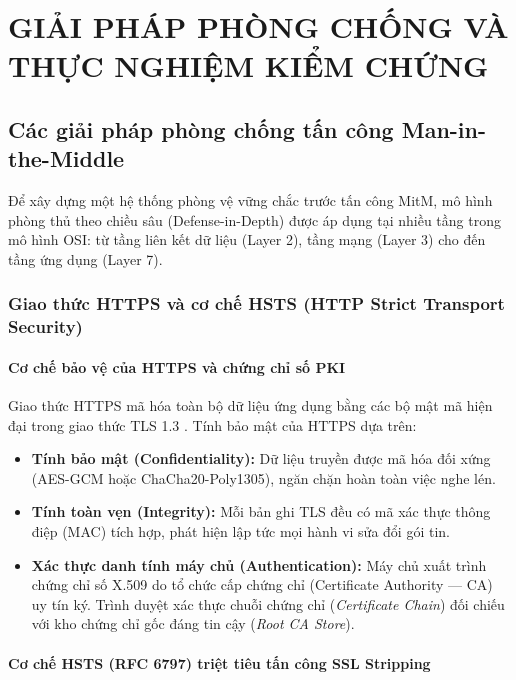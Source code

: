 \chapter{GIẢI PHÁP PHÒNG CHỐNG VÀ THỰC NGHIỆM KIỂM CHỨNG}

\section{Các giải pháp phòng chống tấn công Man-in-the-Middle}

Để xây dựng một hệ thống phòng vệ vững chắc trước tấn công MitM, mô hình phòng thủ theo chiều sâu (Defense-in-Depth) được áp dụng tại nhiều tầng trong mô hình OSI: từ tầng liên kết dữ liệu (Layer 2), tầng mạng (Layer 3) cho đến tầng ứng dụng (Layer 7).

\subsection{Giao thức HTTPS và cơ chế HSTS (HTTP Strict Transport Security)}

\subsubsection{Cơ chế bảo vệ của HTTPS và chứng chỉ số PKI}

Giao thức HTTPS mã hóa toàn bộ dữ liệu ứng dụng bằng các bộ mật mã hiện đại trong giao thức TLS 1.3 \cite{rfc8446_tls13}. Tính bảo mật của HTTPS dựa trên:
\begin{itemize}
  \item \textbf{Tính bảo mật (Confidentiality):} Dữ liệu truyền được mã hóa đối xứng (AES-GCM hoặc ChaCha20-Poly1305), ngăn chặn hoàn toàn việc nghe lén.
  \item \textbf{Tính toàn vẹn (Integrity):} Mỗi bản ghi TLS đều có mã xác thực thông điệp (MAC) tích hợp, phát hiện lập tức mọi hành vi sửa đổi gói tin.
  \item \textbf{Xác thực danh tính máy chủ (Authentication):} Máy chủ xuất trình chứng chỉ số X.509 do tổ chức cấp chứng chỉ (Certificate Authority --- CA) uy tín ký. Trình duyệt xác thực chuỗi chứng chỉ (\textit{Certificate Chain}) đối chiếu với kho chứng chỉ gốc đáng tin cậy (\textit{Root CA Store}).
\end{itemize}

\subsubsection{Cơ chế HSTS (RFC 6797) triệt tiêu tấn công SSL Stripping}

